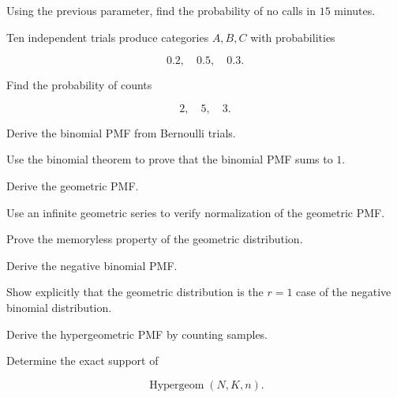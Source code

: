 \begin{exercise}[2]
Using the previous parameter, find the probability of no calls in
\(15\) minutes.
\end{exercise}

\begin{exercise}[2]
Ten independent trials produce categories \(A,B,C\) with probabilities

\[
0.2,\quad0.5,\quad0.3.
\]

Find the probability of counts

\[
2,\quad5,\quad3.
\]
\end{exercise}

\begin{exercise}[3]
Derive the binomial PMF from Bernoulli trials.
\end{exercise}

\begin{exercise}[3]
Use the binomial theorem to prove that the binomial PMF sums to \(1\).
\end{exercise}

\begin{exercise}[3]
Derive the geometric PMF.
\end{exercise}

\begin{exercise}[3]
Use an infinite geometric series to verify normalization of the
geometric PMF.
\end{exercise}

\begin{exercise}[3]
Prove the memoryless property of the geometric distribution.
\end{exercise}

\begin{exercise}[3]
Derive the negative binomial PMF.
\end{exercise}

\begin{exercise}[3]
Show explicitly that the geometric distribution is the \(r=1\) case of
the negative binomial distribution.
\end{exercise}

\begin{exercise}[3]
Derive the hypergeometric PMF by counting samples.
\end{exercise}

\begin{exercise}[3]
Determine the exact support of

\[
\operatorname{Hypergeom}(N,K,n).
\]
\end{exercise}

